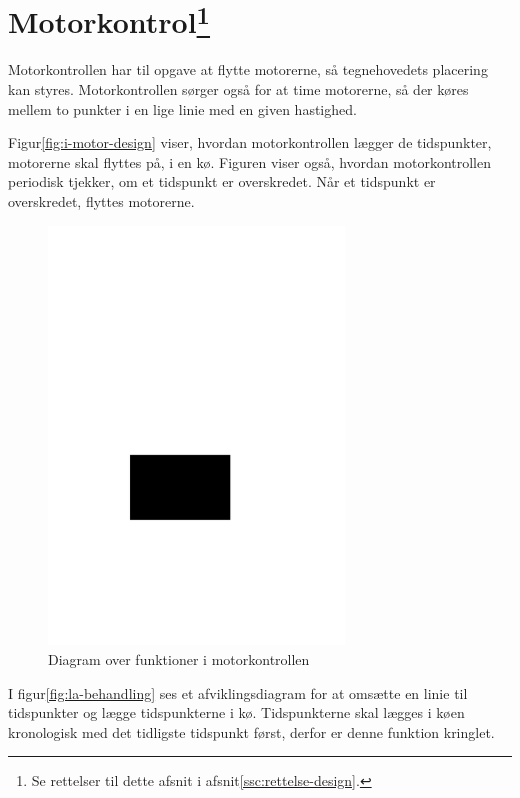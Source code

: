 \section[Motorkontrol (med kø)]{Motorkontrol\footnote{Se rettelser til
    dette afsnit i afsnit\vref{ssc:rettelse-design}.}}




Motorkontrollen har til opgave at flytte motorerne, så tegnehovedets
placering kan styres. Motorkontrollen sørger også for at time
motorerne, så der køres mellem to punkter i en lige linie med en given
hastighed.

Figur\vref{fig:i-motor-design} viser, hvordan motorkontrollen lægger
de tidspunkter, motorerne skal flyttes på, i en kø. Figuren viser
også, hvordan motorkontrollen periodisk tjekker, om et tidspunkt er
overskredet. Når et tidspunkt er overskredet, flyttes motorerne.

\begin{figure}[htbp]
  \centering
  \includegraphics[width=0.7\textwidth]{./img/i-motor-design}
  \caption{Diagram over funktioner i motorkontrollen}
  \label{fig:i-motor-design}
\end{figure}


I figur\vref{fig:la-behandling} ses et afviklingsdiagram for at
omsætte en linie til tidspunkter og lægge tidspunkterne i
kø. Tidspunkterne skal lægges i køen kronologisk med det tidligste
tidspunkt først, derfor er denne funktion kringlet.


